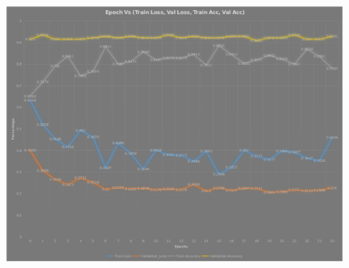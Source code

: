 \documentclass[12pt]{article}
\begin{document}
	\begin{figure}[h]
		\centering
		\includegraphics[width=13cm]{Plot_4.png}
		\label{fig:sub1}
	\end{figure}
	
\end{document}
